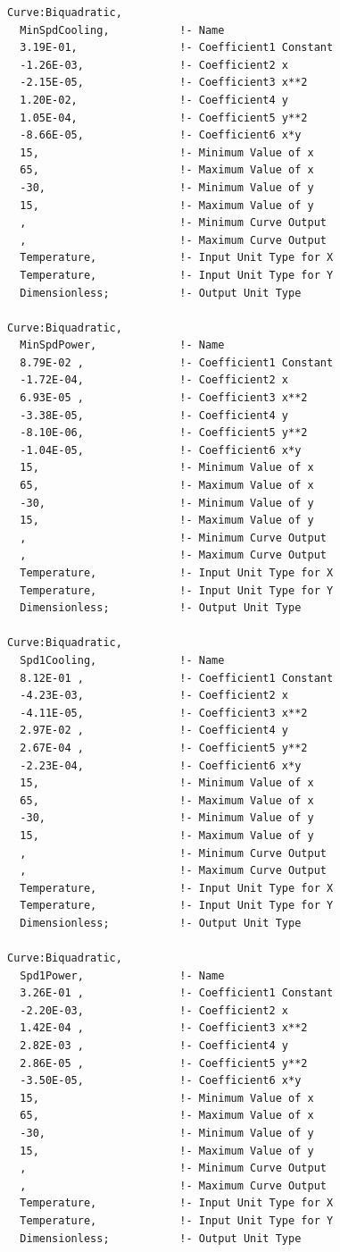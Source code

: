 \begin{lstlisting}
Curve:Biquadratic,
  MinSpdCooling,           !- Name
  3.19E-01,                !- Coefficient1 Constant
  -1.26E-03,               !- Coefficient2 x
  -2.15E-05,               !- Coefficient3 x**2
  1.20E-02,                !- Coefficient4 y
  1.05E-04,                !- Coefficient5 y**2
  -8.66E-05,               !- Coefficient6 x*y
  15,                      !- Minimum Value of x
  65,                      !- Maximum Value of x
  -30,                     !- Minimum Value of y
  15,                      !- Maximum Value of y
  ,                        !- Minimum Curve Output
  ,                        !- Maximum Curve Output
  Temperature,             !- Input Unit Type for X
  Temperature,             !- Input Unit Type for Y
  Dimensionless;           !- Output Unit Type

Curve:Biquadratic,
  MinSpdPower,             !- Name
  8.79E-02 ,               !- Coefficient1 Constant
  -1.72E-04,               !- Coefficient2 x
  6.93E-05 ,               !- Coefficient3 x**2
  -3.38E-05,               !- Coefficient4 y
  -8.10E-06,               !- Coefficient5 y**2
  -1.04E-05,               !- Coefficient6 x*y
  15,                      !- Minimum Value of x
  65,                      !- Maximum Value of x
  -30,                     !- Minimum Value of y
  15,                      !- Maximum Value of y
  ,                        !- Minimum Curve Output
  ,                        !- Maximum Curve Output
  Temperature,             !- Input Unit Type for X
  Temperature,             !- Input Unit Type for Y
  Dimensionless;           !- Output Unit Type

Curve:Biquadratic,
  Spd1Cooling,             !- Name
  8.12E-01 ,               !- Coefficient1 Constant
  -4.23E-03,               !- Coefficient2 x
  -4.11E-05,               !- Coefficient3 x**2
  2.97E-02 ,               !- Coefficient4 y
  2.67E-04 ,               !- Coefficient5 y**2
  -2.23E-04,               !- Coefficient6 x*y
  15,                      !- Minimum Value of x
  65,                      !- Maximum Value of x
  -30,                     !- Minimum Value of y
  15,                      !- Maximum Value of y
  ,                        !- Minimum Curve Output
  ,                        !- Maximum Curve Output
  Temperature,             !- Input Unit Type for X
  Temperature,             !- Input Unit Type for Y
  Dimensionless;           !- Output Unit Type

Curve:Biquadratic,
  Spd1Power,               !- Name
  3.26E-01 ,               !- Coefficient1 Constant
  -2.20E-03,               !- Coefficient2 x
  1.42E-04 ,               !- Coefficient3 x**2
  2.82E-03 ,               !- Coefficient4 y
  2.86E-05 ,               !- Coefficient5 y**2
  -3.50E-05,               !- Coefficient6 x*y
  15,                      !- Minimum Value of x
  65,                      !- Maximum Value of x
  -30,                     !- Minimum Value of y
  15,                      !- Maximum Value of y
  ,                        !- Minimum Curve Output
  ,                        !- Maximum Curve Output
  Temperature,             !- Input Unit Type for X
  Temperature,             !- Input Unit Type for Y
  Dimensionless;           !- Output Unit Type


\end{lstlisting}

